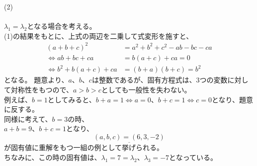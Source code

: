 \documentclass[a4j,10pt,oneside,openany]{jsbook}
\begin{document}
\vspace{1\baselineskip}

{\Large (2)}
\\
\\
$\lambda_{1}=\lambda_{2}$となる場合を考える。\\
(1)の結果をもとに、上式の両辺を二乗して式変形を施すと、
\begin{align*}
(a+b+c)^2	&=a^2+b^2+c^2-ab-bc-ca \\[5pt]
\Leftrightarrow ab+bc+ca &= b(a+c)+ca = 0 \\[5pt]
\Leftrightarrow b^2+b(a+c)+ca &= (b+a)(b+c) =b^2 
\end{align*}
となる。
題意より、$a$、$b$、$c$は整数であるが、固有方程式は、3つの変数に対して対称性をもつので、$a>b>c$としても一般性を失わない。\\
例えば、$b=1$としてみると、$b+a=1\Leftrightarrow a=0$、$b+c=1\Leftrightarrow c=0$となり、題意に反する。\\
同様に考えて、$b=3$の時、\\
$a+b=9$、$b+c=1$となり、
\[ \underline{(a,b,c)=(6,3,-2)} \]
が固有値に重解をもつ一組の例として挙げられる。\\
ちなみに、この時の固有値は、$\lambda_{1}=7=\lambda_{2}$、$\lambda_{3}=-7$となっている。

\vspace{1\baselineskip}
\end{document}
